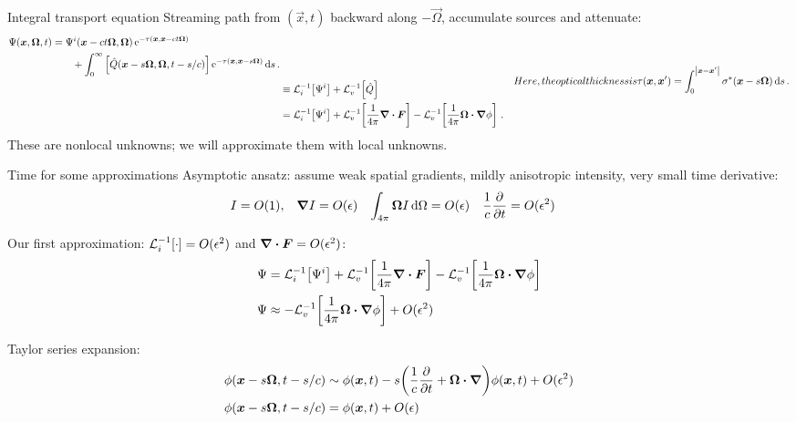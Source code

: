 \documentclass{beamer}
\begin{document}
\begin{frame}{Integral transport equation}
  Streaming path from $(\vec{x}, t)$ backward along $-\vec{\Omega}$, accumulate
  sources and attenuate:
\begin{subequations} \label{eqs:inverseTransport}
  \begin{align} \label{eq:inverseTransportFull}
  \begin{split}
    \Psi(\vec{x}, \vec{\Omega}, t)
    &=
    \Psi^i( \vec{x} - ct \vec{\Omega}, \vec{\Omega})
    \eexp^{ -\tau(\vec{x}, \vec{x} - ct \vec{\Omega})}
    \\
    &\qquad + \int_{0}^{\infty}
    \left[ \hat Q(\vec{x} - s \vec{\Omega}, \vec{\Omega}, t-s/c)
    \right]
    \eexp^{ -\tau(\vec{x}, \vec{x} - s \vec{\Omega})}
    \ud s\,.
  \end{split}
    \\ 
    &\equiv  \lopinv{i}{\Psi^i}
    + \lopinv{v}{\hat Q}
    \\ \nonumber
    &= \lopinv{i}{\Psi^i}
  + \lopinv{v}{\frac{1}{4\pi} \grad \vd\vec{F}} -
  \lopinv{v}{\frac{1}{4\pi} \vec{\Omega}\vd \grad \phi} \,.
  \end{align}
  Here, the optical thickness is 
  \begin{equation} \label{eq:fullTauDefinition}
    \tau(\vec{x}, \vec{x}') = \int_{0}^{\abs{\vec{x} -
    \vec{x}'}} \sigma^\ast(\vec{x}-s\vec{\Omega}) \ud s \,.
  \end{equation}
\end{subequations}
These are nonlocal unknowns; we will approximate them with local unknowns.
\end{frame}

\begin{frame}{Time for some approximations}
  Asymptotic ansatz: assume weak spatial gradients, mildly anisotropic intensity, very small time
  derivative:
\begin{align*}
  I &= O(1), &
  \bm{\nabla} I &= O(\epsilon)&
  \int_{4\pi} \bm{\Omega} I\mathop{}\!\mathrm{d}\Omega &= O(\epsilon)&
  \frac{1}{c} \frac{\partial }{\partial t} &= O(\epsilon^2)
\end{align*}

Our first approximation: $\mathcal{L}_{i}^{-1}\!\left[\cdot\right] = O(\epsilon^2)$ and $\bm{\nabla} \bm{\cdot} \bm{F} =
O(\epsilon^2)$:
\begin{align*}
  \Psi &= \mathcal{L}_{i}^{-1}\!\left[\Psi^i\right]
  + \mathcal{L}_{v}^{-1}\!\left[\frac{1}{4\pi} \bm{\nabla} \bm{\cdot}\bm{F}\right] -
  \mathcal{L}_{v}^{-1}\!\left[\frac{1}{4\pi} \bm{\Omega}\bm{\cdot} \bm{\nabla} \phi\right]
    \\ 
  \Psi 
  &\approx - \mathcal{L}_{v}^{-1}\!\left[\frac{1}{4\pi} \bm{\Omega}\bm{\cdot} \bm{\nabla} \phi\right]
  + O(\epsilon^2)
\end{align*}

Taylor series expansion:
\begin{align} \nonumber
  \phi(\bm{x} - s\bm{\Omega}, t - s/c)
  &\sim \phi(\bm{x}, t)
  - s \bigg( \frac{1}{c} \frac{\partial }{\partial t} + \bm{\Omega} \bm{\cdot} \bm{\nabla} \bigg)
  \phi(\bm{x}, t) + O(\epsilon^2)
\\ \label{eq:taylorPhi}
\phi(\bm{x} - s\bm{\Omega}, t - s/c)
&= \phi(\bm{x}, t) + O(\epsilon)
\end{align}
\end{frame}
\end{document}

